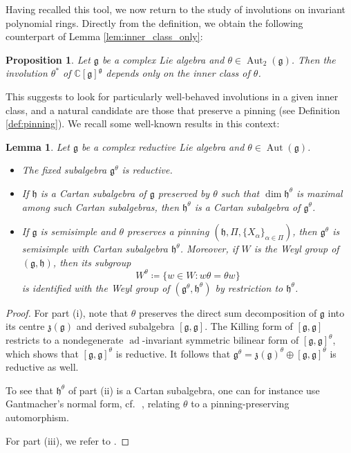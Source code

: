 \documentclass{amsart}
\newcommand{\cf}{cf.\,}
\newcommand{\ad}{\operatorname{ad}}
\newcommand{\Aut}{\operatorname{Aut}}
\newcommand{\C}{\mathbb{C}}
\newcommand{\g}{\mathfrak{g}}
\newcommand{\h}{\mathfrak{h}}
\newcommand{\z}{\mathfrak{z}}
\theoremstyle{definition}
\theoremstyle{plain}
\newtheorem{prop}[defn]{Proposition}
\newtheorem{lem}[defn]{Lemma}
\theoremstyle{remark}
\begin{document}
Having recalled this tool, we now return to the study of involutions on invariant polynomial rings. Directly from the definition, we obtain the following counterpart of Lemma \ref{lem:inner_class_only}:
\begin{prop}
    Let $\g$ be a complex Lie algebra and $\theta\in \Aut_2(\g)$. Then the involution $\theta^*$ of $\C[\g]^\g$ depends only on the inner class of $\theta$.
\end{prop}
This suggests to look for particularly well-behaved involutions in a given inner class, and a natural candidate are those that preserve a pinning (see Definition \ref{def:pinning}). We recall some well-known results in this context:
\begin{lem}
\label{lem:fixed_subalgebras}
    Let $\g$ be a complex reductive Lie algebra and $\theta \in \Aut(\g)$.
    \begin{itemize}
        \item[(i)] The fixed subalgebra $\g^\theta$ is reductive. 
        
        \item[(ii)] If $\h$ is a Cartan subalgebra of $\g$ preserved by $\theta$ such that $\dim \h^\theta$ is maximal among such Cartan subalgebras, then $\h^\theta$ is a Cartan subalgebra of $\g^\theta$. 
        
        \item[(iii)] If $\g$ is semisimple and $\theta$ preserves a pinning $(\h, \Pi, \{X_\alpha\}_{\alpha\in \Pi})$, then $\g^\theta$ is semisimple with Cartan subalgebra $\h^\theta$. Moreover, if $W$ is the Weyl group of $(\g,\h)$, then its subgroup
        $$
            W^\theta \coloneqq \{w\in W\colon w\theta = \theta w\}
        $$
        is identified with the Weyl group of $(\g^\theta, \h^\theta)$ by restriction to $\h^\theta$.
    \end{itemize}
\end{lem}
\begin{proof}
    For part (i), note that $\theta$ preserves the direct sum decomposition of $\g$ into its centre $\z(\g)$ and derived subalgebra $[\g,\g]$. The Killing form of $[\g,\g]$ restricts to a nondegenerate $\ad$-invariant symmetric bilinear form of $[\g,\g]^\theta$, which shows that $[\g,\g]^\theta$ is reductive. It follows that $\g^\theta = \z(\g)^\theta \oplus [\g,\g]^\theta$ is reductive as well. 

    To see that $\h^\theta$ of part (ii) is a Cartan subalgebra, one can for instance use Gantmacher's normal form, \cf\ \cite[Thm.\,4.2]{Onishchik2004_real}, relating $\theta$ to a pinning-preserving automorphism.
    
    For part (iii), we refer to \cite[ch.\,11]{Steinberg1967_Chevalley_groups}.
\end{proof}
\end{document}

